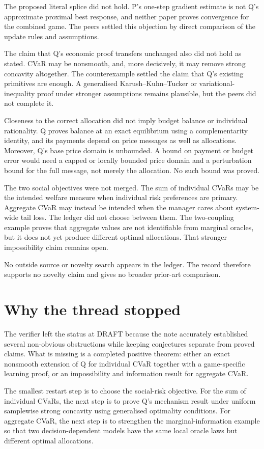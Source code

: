 \documentclass{article}
\begin{document}
The proposed literal splice did not hold. P's one-step gradient estimate is not Q's approximate proximal best response, and neither paper proves convergence for the combined game. The peers settled this objection by direct comparison of the update rules and assumptions.

The claim that Q's economic proof transfers unchanged also did not hold as stated. CVaR may be nonsmooth, and, more decisively, it may remove strong concavity altogether. The counterexample settled the claim that Q's existing primitives are enough. A generalised Karush--Kuhn--Tucker or variational-inequality proof under stronger assumptions remains plausible, but the peers did not complete it.

Closeness to the correct allocation did not imply budget balance or individual rationality. Q proves balance at an exact equilibrium using a complementarity identity, and its payments depend on price messages as well as allocations. Moreover, Q's base price domain is unbounded. A bound on payment or budget error would need a capped or locally bounded price domain and a perturbation bound for the full message, not merely the allocation. No such bound was proved.

The two social objectives were not merged. The sum of individual CVaRs may be the intended welfare measure when individual risk preferences are primary. Aggregate CVaR may instead be intended when the manager cares about system-wide tail loss. The ledger did not choose between them. The two-coupling example proves that aggregate values are not identifiable from marginal oracles, but it does not yet produce different optimal allocations. That stronger impossibility claim remains open.

No outside source or novelty search appears in the ledger. The record therefore supports no novelty claim and gives no broader prior-art comparison.

\section{Why the thread stopped}

The verifier left the status at DRAFT because the note accurately established several non-obvious obstructions while keeping conjectures separate from proved claims. What is missing is a completed positive theorem: either an exact nonsmooth extension of Q for individual CVaR together with a game-specific learning proof, or an impossibility and information result for aggregate CVaR.

The smallest restart step is to choose the social-risk objective. For the sum of individual CVaRs, the next step is to prove Q's mechanism result under uniform samplewise strong concavity using generalised optimality conditions. For aggregate CVaR, the next step is to strengthen the marginal-information example so that two decision-dependent models have the same local oracle laws but different optimal allocations.

\enlargethispage{2\baselineskip}


\end{document}
